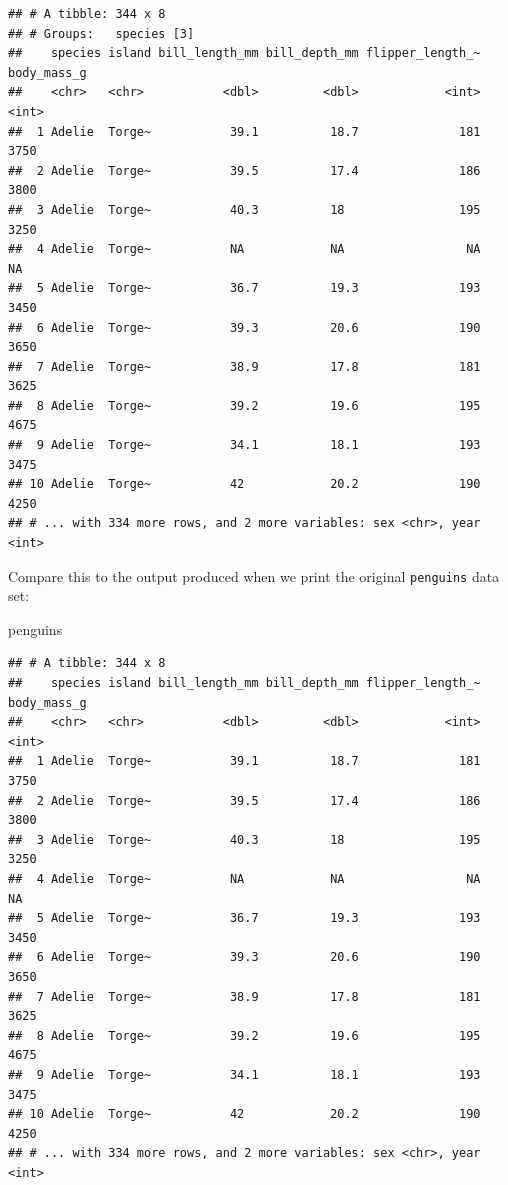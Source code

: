 \documentclass[
]{book}
\newenvironment{Shaded}{\begin{snugshade}}{\end{snugshade}}
\newcommand{\NormalTok}[1]{#1}
\begin{document}
\begin{verbatim}
## # A tibble: 344 x 8
## # Groups:   species [3]
##    species island bill_length_mm bill_depth_mm flipper_length_~ body_mass_g
##    <chr>   <chr>           <dbl>         <dbl>            <int>       <int>
##  1 Adelie  Torge~           39.1          18.7              181        3750
##  2 Adelie  Torge~           39.5          17.4              186        3800
##  3 Adelie  Torge~           40.3          18                195        3250
##  4 Adelie  Torge~           NA            NA                 NA          NA
##  5 Adelie  Torge~           36.7          19.3              193        3450
##  6 Adelie  Torge~           39.3          20.6              190        3650
##  7 Adelie  Torge~           38.9          17.8              181        3625
##  8 Adelie  Torge~           39.2          19.6              195        4675
##  9 Adelie  Torge~           34.1          18.1              193        3475
## 10 Adelie  Torge~           42            20.2              190        4250
## # ... with 334 more rows, and 2 more variables: sex <chr>, year <int>
\end{verbatim}

Compare this to the output produced when we print the original \texttt{penguins} data set:

\begin{Shaded}
\begin{Highlighting}[]
\NormalTok{penguins}
\end{Highlighting}
\end{Shaded}

\begin{verbatim}
## # A tibble: 344 x 8
##    species island bill_length_mm bill_depth_mm flipper_length_~ body_mass_g
##    <chr>   <chr>           <dbl>         <dbl>            <int>       <int>
##  1 Adelie  Torge~           39.1          18.7              181        3750
##  2 Adelie  Torge~           39.5          17.4              186        3800
##  3 Adelie  Torge~           40.3          18                195        3250
##  4 Adelie  Torge~           NA            NA                 NA          NA
##  5 Adelie  Torge~           36.7          19.3              193        3450
##  6 Adelie  Torge~           39.3          20.6              190        3650
##  7 Adelie  Torge~           38.9          17.8              181        3625
##  8 Adelie  Torge~           39.2          19.6              195        4675
##  9 Adelie  Torge~           34.1          18.1              193        3475
## 10 Adelie  Torge~           42            20.2              190        4250
## # ... with 334 more rows, and 2 more variables: sex <chr>, year <int>
\end{verbatim}
\end{document}

